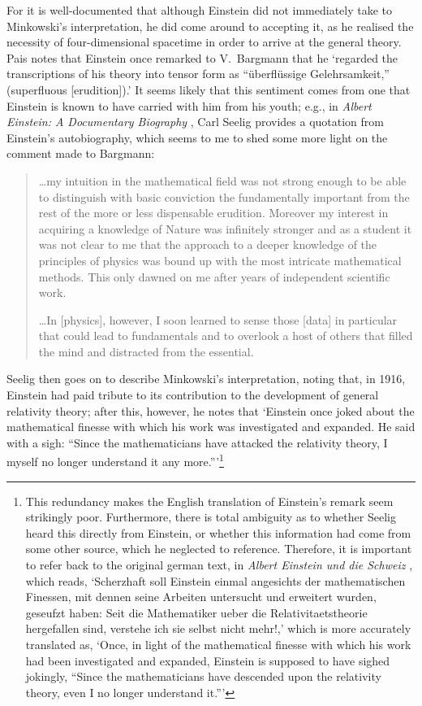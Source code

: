 For it is well-documented that although Einstein did not immediately take to Minkowski's interpretation, he did come around to accepting it, as he realised the necessity of four-dimensional spacetime in order to arrive at the general theory. Pais \cite{Pais1982} notes that Einstein once remarked to V.~Bargmann that he `regarded the transcriptions of his theory into tensor form as ``\"{u}berfl\"{u}ssige Gelehrsamkeit,{''} (superfluous [erudition]).' It seems likely that this sentiment comes from one that Einstein is known to have carried with him from his youth; e.g., in \textit{Albert Einstein: A Documentary Biography} \cite{Seelig1956}, Carl Seelig provides a quotation from Einstein's autobiography, which seems to me to shed some more light on the comment made to Bargmann: 
\begin{quotation}
\ldots my intuition in the mathematical field was not strong enough to be able to distinguish with basic conviction the fundamentally important from the rest of the more or less dispensable erudition. Moreover my interest in acquiring a knowledge of Nature was infinitely stronger and as a student it was not clear to me that the approach to a deeper knowledge of the principles of physics was bound up with the most intricate mathematical methods. This only dawned on me after years of independent scientific work.

\ldots In [physics], however, I soon learned to sense those [data] in particular that could lead to fundamentals and to overlook a host of others that filled the mind and distracted from the essential.
\end{quotation}
Seelig then goes on to describe Minkowski's interpretation, noting that, in 1916, Einstein had paid tribute to its contribution to the development of general relativity theory; after this, however, he notes that `Einstein once joked about the mathematical finesse with which his work was investigated and expanded. He said with a sigh: ``Since the mathematicians have attacked the relativity theory, I myself no longer understand it any more.{''}'\footnote{This redundancy makes the English translation of Einstein's remark seem strikingly poor. Furthermore, there is total ambiguity as to whether Seelig heard this directly from Einstein, or whether this information had come from some other source, which he neglected to reference. Therefore, it is important to refer back to the original german text, in \textit{Albert Einstein und die Schweiz} \cite{Seelig1952}, which reads, `Scherzhaft soll Einstein einmal angesichts der mathematischen Finessen, mit dennen seine Arbeiten untersucht und erweitert wurden, geseufzt haben: {\flqq}Seit die Mathematiker ueber die Relativitaetstheorie hergefallen sind, verstehe ich sie selbst nicht mehr!{\frqq},' which is more accurately translated as, `Once, in light of the mathematical finesse with which his work had been investigated and expanded, Einstein is supposed to have sighed jokingly, ``Since the mathematicians have descended upon the relativity theory, even I no longer understand it.{''}'} 

